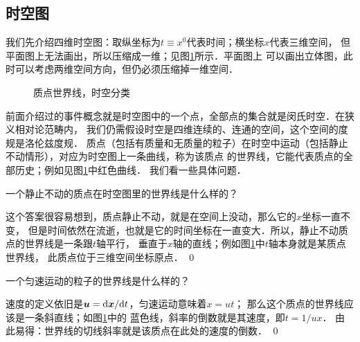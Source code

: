\subsection{时空图}\label{chsr:sec_spacetime}
我们先介绍四维{\heiti 时空图}：取纵坐标为$t\equiv x^0$代表时间；横坐标$x$代表三维空间，
但平面图上无法画出，所以压缩成一维；见图\ref{chsr:pic_spacetime}所示．平面图上
可以画出立体图，此时可以考虑两维空间方向，但仍必须压缩掉一维空间．
\begin{figure}[htb]
    \centering
    \caption{质点世界线，时空分类}\label{chsr:pic_spacetime}
\end{figure}

前面介绍过的事件概念就是时空图中的一个点，全部点的集合就是闵氏时空．在狭义相对论范畴内，
我们仍需假设时空是四维连续的、连通的空间，这个空间的度规是洛伦兹度规．
质点（包括有质量和无质量的粒子）在时空中运动（包括静止不动情形），对应为时空图上一条曲线，称为该质点
的{\heiti 世界线}，它能代表质点的全部历史；例如见图\ref{chsr:pic_spacetime}中红色曲线．
我们看一些具体问题．

\begin{example}
    一个静止不动的质点在时空图里的世界线是什么样的？
\end{example}
这个答案很容易想到，质点静止不动，就是在空间上没动，那么它的$x$坐标一直不变，
但是时间依然在流逝，也就是它的时间坐标在一直变大．所以，静止不动质点的世界线是一条跟$t$轴平行，
垂直于$x$轴的直线；例如图\ref{chsr:pic_spacetime}中$t$轴本身就是某质点世界线，
此质点位于三维空间坐标原点．
\qed

\begin{example}
一个匀速运动的粒子的世界线是什么样的？
\end{example}
速度的定义依旧是$\boldsymbol{u}={\rm d}\boldsymbol{x}/{{\rm d}t}$，匀速运动意味着$x=u t$；
那么这个质点的世界线应该是一条斜直线；如图\ref{chsr:pic_spacetime}中的
蓝色线，斜率的倒数就是其速度，即$t=1/u x$．
由此易得：{\kaishu 世界线的切线斜率就是该质点在此处的速度的倒数}．
\qed

